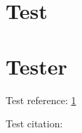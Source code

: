 \documentclass[a4paper,fleqn]{article}
\begin{document}
\tableofcontents

\section{Test}
\label{sec:test}

\section{Tester}
Test reference: \ref{sec:test}

Test citation: \cite{Wilf1990}



\end{document}
